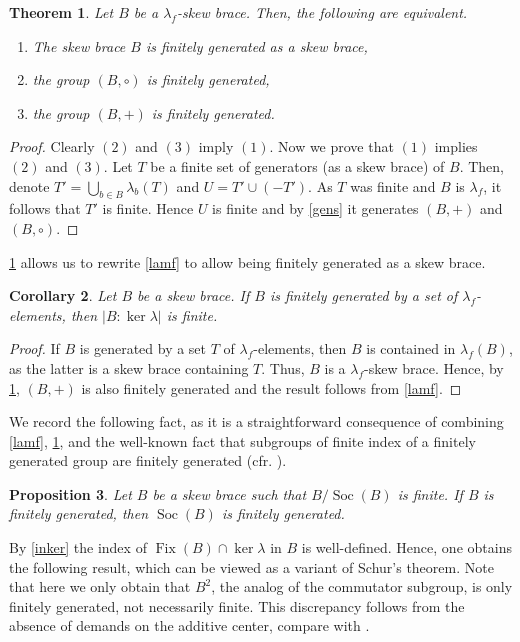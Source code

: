 \documentclass{amsart}
\newcommand{\Soc}{\operatorname{Soc}}
\newcommand{\Fix}{\operatorname{Fix}}
\newtheorem{thm}{Theorem}[section]
\newtheorem{cor}[thm]{Corollary}
\newtheorem{pro}[thm]{Proposition}
\begin{document}
\begin{thm}\label{fg}
    Let $B$ be a $\lambda_f$-skew brace. Then, the following are equivalent.
    \begin{enumerate}
        \item The skew brace $B$ is finitely generated as a skew brace,
        \item the group $(B,\circ)$ is finitely generated,
        \item the group $(B,+)$ is finitely generated.
    \end{enumerate}
\end{thm}
\begin{proof}
    Clearly $(2)$ and $(3)$ imply $(1)$.
    Now we prove that $(1)$ implies $(2)$ and $(3)$.
    Let $T$ be a finite set of generators (as a skew brace) of $B$. 
    Then, denote $T'=\bigcup_{b\in B}\lambda_b(T)$ and $U=T' \cup (-T')$.
    As $T$ was finite and $B$ is $\lambda_f$, it follows that $T'$ is finite.
    Hence $U$ is finite and by \cref{gens} it generates $(B,+)$ and $(B,\circ)$.
\end{proof}
\cref{fg} allows us to rewrite \cref{lamf} to allow being finitely generated as a skew brace.
\begin{cor}
    Let $B$ be a skew brace. If $B$ is finitely generated by a set of $\lambda_f$-elements, then $|B:\ker\lambda|$ is finite.
\end{cor}
\begin{proof}
    If $B$ is generated by a set $T$ of $\lambda_f$-elements, then $B$ is contained in $\lambda_f(B)$, as the latter is a skew brace containing $T$. Thus, $B$ is a $\lambda_f$-skew brace. Hence, by \cref{fg}, $(B,+)$ is also finitely generated and the result follows from \cref{lamf}. 
\end{proof}

We record the following fact, as it is a straightforward consequence of combining \cref{lamf}, \cref{fg}, and the well-known fact that subgroups of finite index of a finitely generated group are finitely generated (cfr. \cite[Result 1.6.11]{robinson2}). 

\begin{pro}
    Let $B$ be a skew brace such that $B/\Soc(B)$ is finite. If $B$ is finitely generated, then $\Soc(B)$ is finitely generated.
\end{pro}

By \cref{inker} the index of $\Fix(B) \cap \ker \lambda$ in $B$ is well-defined. Hence, one obtains the following result, which can be viewed as a variant of Schur's theorem. Note that here we only obtain that $B^2$, the analog of the commutator subgroup, is only finitely generated, not necessarily finite. This discrepancy follows from the absence of demands on the additive center, compare with \cite{MR4256133}.
\end{document}
